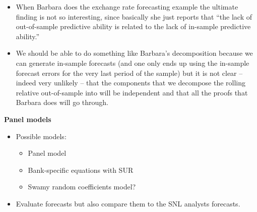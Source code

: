 \documentclass[11pt]{article}
\begin{document}
\begin{itemize}
\begin{itemize}
\end{itemize}
\item When Barbara does the exchange rate forecasting example the ultimate finding is not so interesting, since basically she just reports that ``the lack of out-of-sample predictive ability is related to the lack of in-sample predictive ability.''
\item We should be able to do something like Barbara's decomposition because we can generate in-sample forecasts (and one only ends up using the in-sample forecast errors for the very last period of the sample) but it is not clear -- indeed very unlikely -- that the components that we decompose the rolling relative out-of-sample into will be independent and that all the proofs that Barbara does will go through.
\end{itemize}

\textbf{Panel models}
\begin{itemize}
\item  Possible models: 
\begin{itemize}
\item Panel model
\item Bank-specific equations with SUR
\item Swamy random coefficients model?
\end{itemize}
\item Evaluate forecasts but also compare them to the SNL analysts forecasts.
\end{itemize}
\end{document}
